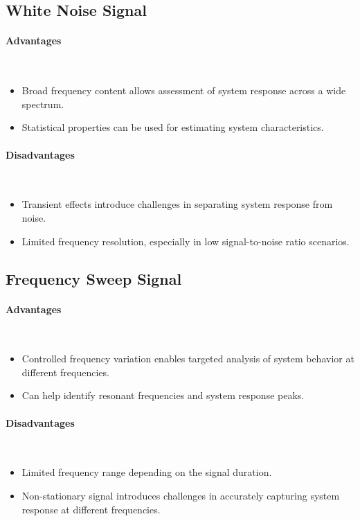 \documentclass[
	a4paper,
	11pt,
]{article}
\begin{document}
\subsection{White Noise Signal}

\paragraph{Advantages}\mbox{}\\

\begin{itemize}
    \item Broad frequency content allows assessment of system response across a wide spectrum.
    \item Statistical properties can be used for estimating system characteristics.
\end{itemize}

\paragraph{Disadvantages}\mbox{}\\

\begin{itemize}
    \item Transient effects introduce challenges in separating system response from noise.
    \item Limited frequency resolution, especially in low signal-to-noise ratio scenarios.
\end{itemize}

\subsection{Frequency Sweep Signal}

\paragraph{Advantages}\mbox{}\\

\begin{itemize}
    \item Controlled frequency variation enables targeted analysis of system behavior at different frequencies.
    \item Can help identify resonant frequencies and system response peaks.
\end{itemize}

\paragraph{Disadvantages}\mbox{}\\

\begin{itemize}
    \item Limited frequency range depending on the signal duration.
    \item Non-stationary signal introduces challenges in accurately capturing system response at different frequencies.
\end{itemize}
\end{document}
